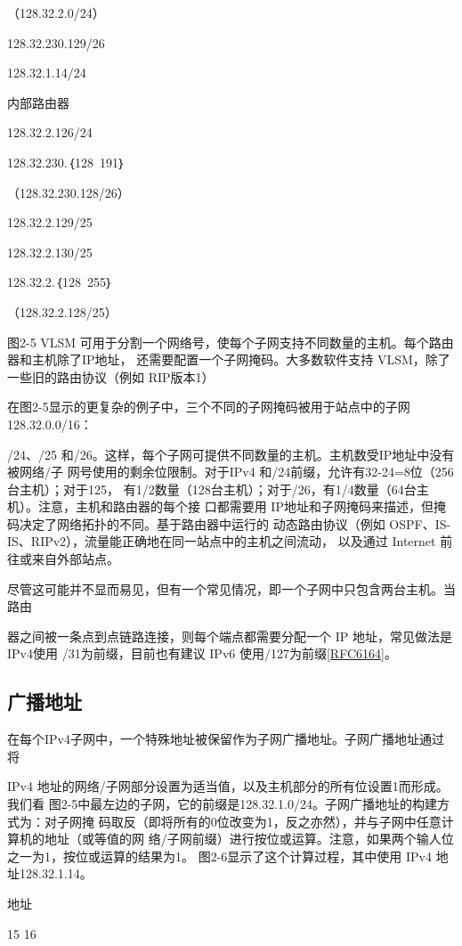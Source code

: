 （128.32.2.0/24）

128.32.230.129/26

128.32.1.14/24

内部路由器

128.32.2.126/24

128.32.230.｛128~191｝

（128.32.230.128/26）

128.32.2.129/25

128.32.2.130/25

128.32.2.｛128~255｝

（128.32.2.128/25）

图2-5 VLSM 可用于分割一个网络号，使每个子网支持不同数量的主机。每个路由器和主机除了IP地址，
还需要配置一个子网掩码。大多数软件支持 VLSM，除了一些旧的路由协议（例如 RIP版本1）

在图2-5显示的更复杂的例子中，三个不同的子网掩码被用于站点中的子网128.32.0.0/16：

/24、/25 和/26。这样，每个子网可提供不同数量的主机。主机数受IP地址中没有被网络/子
网号使用的剩余位限制。对于IPv4 和/24前缀，允许有32-24=8位（256台主机）；对于125，
有1/2数量（128台主机）；对于/26，有1/4数量（64台主机）。注意，主机和路由器的每个接
口都需要用 IP地址和子网掩码来描述，但掩码决定了网络拓扑的不同。基于路由器中运行的
动态路由协议（例如 OSPF、IS-IS、RIPv2），流量能正确地在同一站点中的主机之间流动，
以及通过 Internet 前往或来自外部站点。

尽管这可能并不显而易见，但有一个常见情况，即一个子网中只包含两台主机。当路由

器之间被一条点到点链路连接，则每个端点都需要分配一个 IP 地址，常见做法是IPv4使用
/31为前缀，目前也有建议 IPv6 使用/127为前缀\href{https://www.rfc-editor.org/rfc/rfc6164}{[RFC6164]}。

\subsection{广播地址}
在每个IPv4子网中，一个特殊地址被保留作为子网广播地址。子网广播地址通过将

IPv4 地址的网络/子网部分设置为适当值，以及主机部分的所有位设置1而形成。我们看
图2-5中最左边的子网，它的前缀是128.32.1.0/24。子网广播地址的构建方式为：对子网掩
码取反（即将所有的0位改变为1，反之亦然），并与子网中任意计算机的地址（或等值的网
络/子网前缀）进行按位或运算。注意，如果两个输人位之一为1，按位或运算的结果为1。
图2-6显示了这个计算过程，其中使用 IPv4 地址128.32.1.14。

地址

15 16

